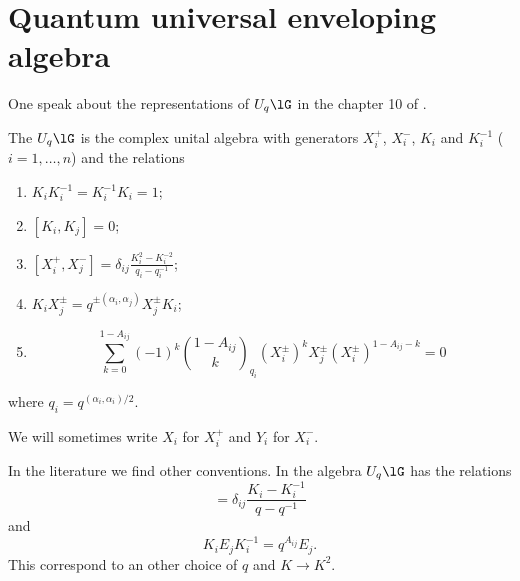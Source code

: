 \section{Quantum universal enveloping algebra}
One speak about the representations of \( U_q\lG\) in the chapter 10 of \cite{GuideToQuantumGroups}.

\begin{definition}      \label{DefUqlG}
	The  \( U_q\lG\) is the complex unital algebra with generators \( X_i^+\), \( X_i^-\), \( K_i\) and \( K_i^{-1}\) (\( i=1,\ldots,n\)) and the relations
	\begin{enumerate}
		\item
		      \( K_iK_i^{-1}=K_i^{-1}K_i=1\);
		\item
		      \( [K_i,K_j]=0\);
		\item
		      \( [X_i^+,X_j^-]=\delta_{ij}\frac{ K_i^2-K_i^{-2} }{ q_i-q_i^{-1} }\);
		\item       \label{EqUqlGdefiv}
		      \( K_iX_j^{\pm}=q^{\pm(\alpha_i,\alpha_j)}X_j^{\pm}K_i\);
		\item
		      \begin{equation}
			      \sum_{k=0}^{1-A_{ij}}(-1)^k\binom{1-A_{ij}}{k}_{q_i}(X_i^{\pm})^kX_j^{\pm}(X_i^{\pm})^{1-A_{ij}-k}=0
		      \end{equation}
	\end{enumerate}
	where \( q_i=q^{(\alpha_i,\alpha_i)/2}\).
\end{definition}
We will sometimes write \( X_i\) for \( X_i^+\) and \( Y_i\) for \( X_i^-\).

\begin{remark}
	In the literature we find other conventions. In \cite{Kassel} the algebra \( U_q\lG\) has the relations
	\begin{equation}
		[E_i,F_j]=\delta_{ij}\frac{ K_i-K_i^{-1} }{ q-q^{-1} }
	\end{equation}
	and
	\begin{equation}
		K_iE_jK_i^{-1}=q^{A_{ij}}E_j.
	\end{equation}
	This correspond to an other choice of \( q\) and \( K\to K^2\).
\end{remark}

